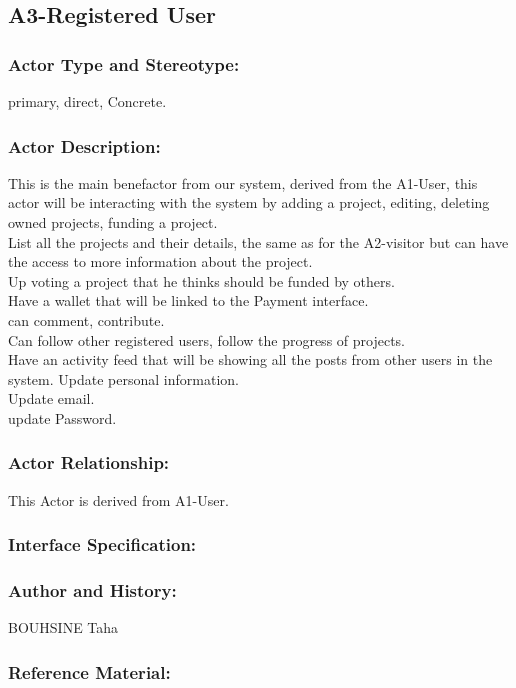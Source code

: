 \documentclass[11pt, openany]{report}
\begin{document}
\clearpage

\subsection{A3-Registered User}
\label{A3}
\subsubsection{Actor Type and Stereotype:}
primary, direct, Concrete.
\subsubsection{Actor Description:}
This is the main benefactor from our system, derived from the A1-User, this actor will be interacting with the system by adding a project, editing, deleting owned projects, funding a project.\\
List all the projects and their details, the same as for the A2-visitor but can have the access to more information about the project.\\
Up voting a project that he thinks should be funded by others.\\
Have a wallet that will be linked to the Payment interface.\\
can comment, contribute.\\
Can follow other registered users, follow the progress of projects.\\
Have an activity feed that will be showing all the posts from other users in the system.
Update personal information.\\
Update email.\\
update Password.\\
\subsubsection{Actor Relationship:}
This Actor is derived from A1-User.
\subsubsection{Interface Specification:}
\subsubsection{Author and History:}
BOUHSINE Taha
\subsubsection{Reference Material:}
\end{document}
